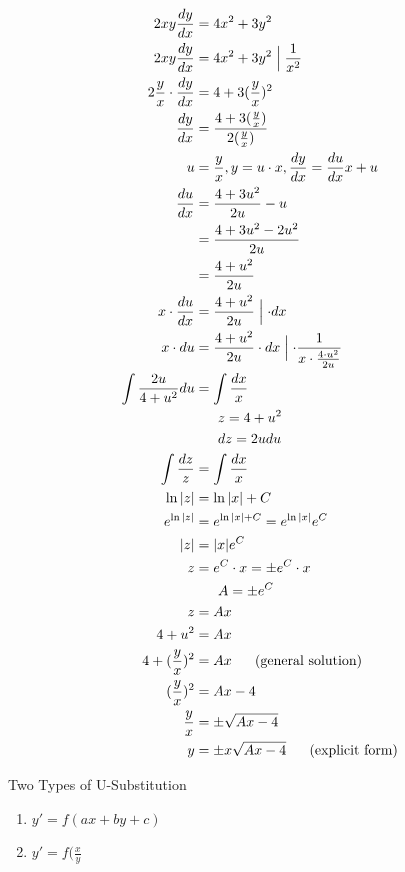 \documentclass[10pt, letterpaper]{article}
\begin{document}
\begin{enumerate}
\begin{align*}
2xy \frac{dy}{dx} &= 4x^2 + 3y^2\\
2xy \frac{dy}{dx} &= 4x^2 + 3y^2 \Bigm \lvert \frac{1}{x^2}\\
2 \frac{y}{x} \cdot \frac{dy}{dx} &= 4 + 3(\frac{y}{x})^2\\
\frac{dy}{dx} &= \frac{4+3 (\frac{y}{x})}{2(\frac{y}{x})}\\
u &= \frac{y}{x}, y = u \cdot x, \frac{dy}{dx}=\frac{du}{dx}x+u\\
\frac{du}{dx} &= \frac{4+3u^2}{2u} -u\\
&= \frac{4+3u^2-2u^2}{2u}\\
&= \frac{4+u^2}{2u}\\
x \cdot \frac{du}{dx} &= \frac{4+u^2}{2u} \Bigm \lvert \cdot dx\\
x \cdot du &= \frac{4+u^2}{2u} \cdot dx \Bigm \lvert \cdot \frac{1}{x\cdot \frac{4\cdot u^2}{2u}}\\
\int \limits \frac{2u}{4+u^2} du &= \int \limits \frac{dx}{x}\\
&~~~~~ z=4+u^2\\
&~~~~~ dz=2udu\\
\int \limits \frac{dz}{z} &= \int \limits \frac{dx}{x}\\
\ln|z| &= \ln|x| + C\\
e^{\ln|z|} &= e^{\ln|x|+C} = e^{\ln|x|}e^{C}\\
|z| &= |x|e^C\\
z &= e^C \cdot x=\pm e^C \cdot x\\
&~~~~~ A=\pm e^C\\
z &= Ax\\
4+u^2 &= Ax\\
4+(\frac{y}{x})^2 &= Ax ~~~~~ (\text{general solution})\\
(\frac{y}{x})^2 &= Ax-4\\
\frac{y}{x} &= \pm \sqrt{Ax-4}\\
y &= \pm x \sqrt{Ax-4} ~~~~~ (\text{explicit form})
\end{align*}
\end{enumerate}

Two Types of U-Substitution
\begin{enumerate}
	\item $y' = f(ax+by+c)$
	\item $y' = f(\frac{x}{y}$
\end{enumerate}
\end{document}
